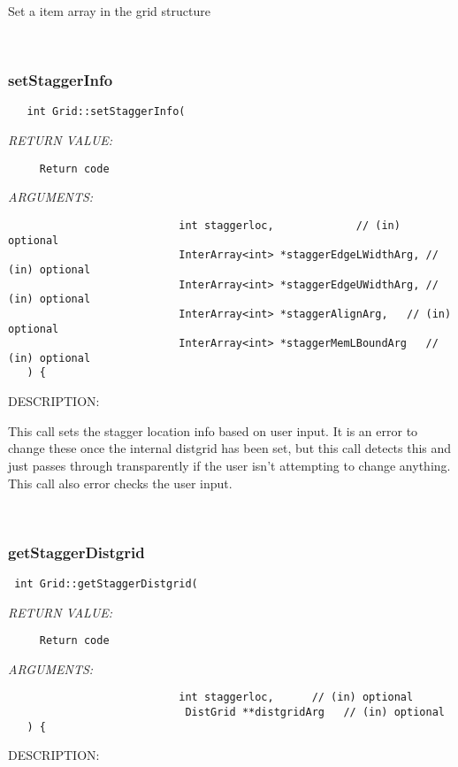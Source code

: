      Set a item array in the grid structure
   
 
\mbox{}\hrulefill\ 
 
\subsubsection [setStaggerInfo] {setStaggerInfo}


  
\begin{verbatim}   int Grid::setStaggerInfo(
 \end{verbatim}{\em RETURN VALUE:}
\begin{verbatim}     Return code\end{verbatim}{\em ARGUMENTS:}
\begin{verbatim}                           int staggerloc,             // (in) optional
                           InterArray<int> *staggerEdgeLWidthArg, // (in) optional
                           InterArray<int> *staggerEdgeUWidthArg, // (in) optional
                           InterArray<int> *staggerAlignArg,   // (in) optional 
                           InterArray<int> *staggerMemLBoundArg   // (in) optional 
   ) {\end{verbatim}
{\sf DESCRIPTION:\\ }


    This call sets the stagger location info based on user input.
    It is an error to change these once the internal distgrid has been set, 
    but this call detects this and  just passes through transparently if the user
    isn't attempting to change anything. This call also error checks the user input. 
 
\mbox{}\hrulefill\ 
 
\subsubsection [getStaggerDistgrid] {getStaggerDistgrid}


  
\begin{verbatim} int Grid::getStaggerDistgrid(
 \end{verbatim}{\em RETURN VALUE:}
\begin{verbatim}     Return code\end{verbatim}{\em ARGUMENTS:}
\begin{verbatim}                           int staggerloc,      // (in) optional
                            DistGrid **distgridArg   // (in) optional 
   ) {\end{verbatim}
{\sf DESCRIPTION:\\ }


